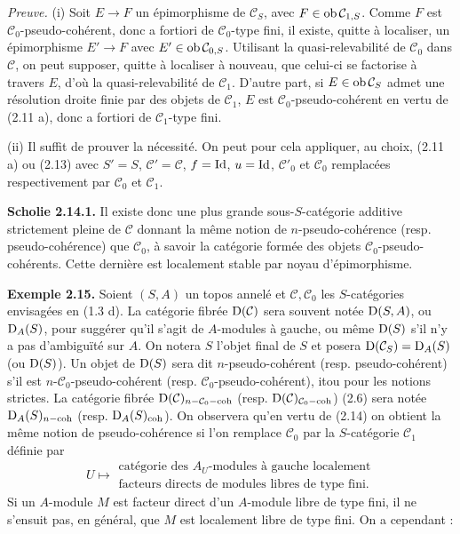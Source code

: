 \documentclass[11pt]{article}
\begin{document}
\emph{Preuve.} (i) Soit \(E\to F\) un épimorphisme de \(\mathcal C_S\), avec \(F\in\operatorname{ob}\mathcal C_{1,S}\). Comme \(F\) est \(\mathcal C_0\)-pseudo-cohérent, donc a fortiori de \(\mathcal C_0\)-type fini, il existe, quitte à localiser, un épimorphisme \(E'\to F\) avec \(E'\in\operatorname{ob}\mathcal C_{0,S}\). Utilisant la quasi-relevabilité de \(\mathcal C_0\) dans \(\mathcal C\), on peut supposer, quitte à localiser à nouveau, que celui-ci se factorise à travers \(E\), d'où la quasi-relevabilité de \(\mathcal C_1\). D'autre part, si \(E\in\operatorname{ob}\mathcal C_S\) admet une résolution droite finie par des objets de \(\mathcal C_1\), \(E\) est \(\mathcal C_0\)-pseudo-cohérent en vertu de (2.11 a), donc a fortiori de \(\mathcal C_1\)-type fini.

(ii) Il suffit de prouver la nécessité. On peut pour cela appliquer, au choix, (2.11 a) ou (2.13) avec \(S'=S\), \(\mathcal C'=\mathcal C\), \(f=\operatorname{Id}\), \(u=\operatorname{Id}\), \(\mathcal C'_0\) et \(\mathcal C_0\) remplacées respectivement par \(\mathcal C_0\) et \(\mathcal C_1\).

\textbf{Scholie 2.14.1.} Il existe donc une plus grande sous-\(S\)-catégorie additive strictement pleine de \(\mathcal C\) donnant la même notion de \(n\)-pseudo-cohérence (resp. pseudo-cohérence) que \(\mathcal C_0\), à savoir la catégorie formée des objets \(\mathcal C_0\)-pseudo-cohérents. Cette dernière est localement stable par noyau d'épimorphisme.

\textbf{Exemple 2.15.} Soient \((S,A)\) un topos annelé et \(\mathcal C,\mathcal C_0\) les \(S\)-catégories envisagées en (1.3 d). La catégorie fibrée \(\mathrm D(\mathcal C)\) sera souvent notée \(\mathrm D(S,A)\), ou \(\mathrm D_A(S)\), pour suggérer qu'il s'agit de \(A\)-modules à gauche, ou même \(\mathrm D(S)\) s'il n'y a pas d'ambiguïté sur \(A\). On notera \(S\) l'objet final de \(S\) et posera \(\mathrm D(\mathcal C_S)=\mathrm D_A(S)\) (ou \(\mathrm D(S)\)). Un objet de \(\mathrm D(S)\) sera dit \(n\)-pseudo-cohérent (resp. pseudo-cohérent) s'il est \(n\)-\(\mathcal C_0\)-pseudo-cohérent (resp. \(\mathcal C_0\)-pseudo-cohérent), itou pour les notions strictes. La catégorie fibrée \(\mathrm D(\mathcal C)_{n-\mathcal C_0-\operatorname{coh}}\) (resp. \(\mathrm D(\mathcal C)_{\mathcal C_0-\operatorname{coh}}\)) (2.6) sera notée \(\mathrm D_A(S)_{n-\operatorname{coh}}\) (resp. \(\mathrm D_A(S)_{\operatorname{coh}}\)). On observera qu'en vertu de (2.14) on obtient la même notion de pseudo-cohérence si l'on remplace \(\mathcal C_0\) par la \(S\)-catégorie \(\mathcal C_1\) définie par
\[
  U\longmapsto
  \begin{gathered}
  \text{catégorie des }A_U\text{-modules à gauche localement}\\
  \text{facteurs directs de modules libres de type fini}.
  \end{gathered}
\]
Si un \(A\)-module \(M\) est facteur direct d'un \(A\)-module libre de type fini, il ne s'ensuit pas, en général, que \(M\) est localement libre de type fini. On a cependant :
\end{document}
